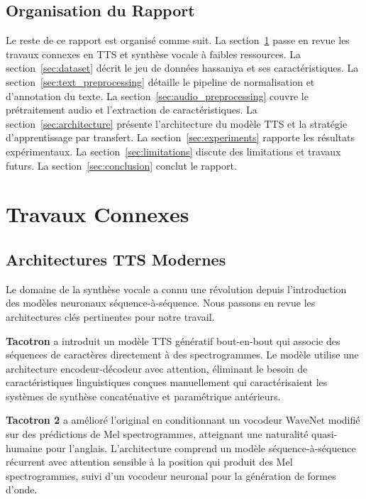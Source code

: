 \documentclass[12pt,a4paper]{article}
\begin{document}
\subsection{Organisation du Rapport}

Le reste de ce rapport est organisé comme suit. La section~\ref{sec:related_work} passe en revue les travaux connexes en TTS et synthèse vocale à faibles ressources. La section~\ref{sec:dataset} décrit le jeu de données hassaniya et ses caractéristiques. La section~\ref{sec:text_preprocessing} détaille le pipeline de normalisation et d'annotation du texte. La section~\ref{sec:audio_preprocessing} couvre le prétraitement audio et l'extraction de caractéristiques. La section~\ref{sec:architecture} présente l'architecture du modèle TTS et la stratégie d'apprentissage par transfert. La section~\ref{sec:experiments} rapporte les résultats expérimentaux. La section~\ref{sec:limitations} discute des limitations et travaux futurs. La section~\ref{sec:conclusion} conclut le rapport.

\section{Travaux Connexes}
\label{sec:related_work}

\subsection{Architectures TTS Modernes}

Le domaine de la synthèse vocale a connu une révolution depuis l'introduction des modèles neuronaux séquence-à-séquence. Nous passons en revue les architectures clés pertinentes pour notre travail.

\textbf{Tacotron} \citep{wang2017tacotron} a introduit un modèle TTS génératif bout-en-bout qui associe des séquences de caractères directement à des spectrogrammes. Le modèle utilise une architecture encodeur-décodeur avec attention, éliminant le besoin de caractéristiques linguistiques conçues manuellement qui caractérisaient les systèmes de synthèse concaténative et paramétrique antérieurs.

\textbf{Tacotron 2} \citep{shen2018natural} a amélioré l'original en conditionnant un vocodeur WaveNet modifié sur des prédictions de Mel spectrogrammes, atteignant une naturalité quasi-humaine pour l'anglais. L'architecture comprend un modèle séquence-à-séquence récurrent avec attention sensible à la position qui produit des Mel spectrogrammes, suivi d'un vocodeur neuronal pour la génération de formes d'onde.
\end{document}
